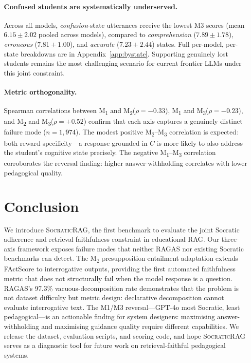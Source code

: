 \documentclass[11pt]{article}
\newcommand{\ours}{\textsc{SocraticRAG}\xspace}
\newcommand{\mtwo}{M\textsubscript{2}\xspace}
\newcommand{\mone}{M\textsubscript{1}\xspace}
\newcommand{\mthree}{M\textsubscript{3}\xspace}
\begin{document}
\paragraph{Confused students are systematically underserved.}
Across all models, \textit{confusion}-state utterances receive the lowest
M3 scores (mean $6.15 \pm 2.02$ pooled across models), compared to
\textit{comprehension} ($7.89 \pm 1.78$), \textit{erroneous} ($7.81 \pm
1.00$), and \textit{accurate} ($7.23 \pm 2.44$) states.
Full per-model, per-state breakdowns are in Appendix~\ref{app:bystate}.
Supporting genuinely lost students remains the most challenging scenario for
current frontier LLMs under this joint constraint.

\paragraph{Metric orthogonality.}
Spearman correlations between \mone and \mtwo ($\rho = {-0.33}$), \mone and
\mthree ($\rho = {-0.23}$), and \mtwo and \mthree ($\rho = {+0.52}$) confirm
that each axis captures a genuinely distinct failure mode ($n = 1{,}974$).
The modest positive \mtwo--\mthree correlation is expected: both reward
specificity---a response grounded in $C$ is more likely to also address the
student's cognitive state precisely.
The negative \mone--\mthree correlation corroborates the reversal finding:
higher answer-withholding correlates with lower pedagogical quality.

\section{Conclusion}

We introduce \ours, the first benchmark to evaluate the joint Socratic
adherence and retrieval faithfulness constraint in educational RAG.
Our three-axis framework exposes failure modes that neither RAGAS nor
existing Socratic benchmarks can detect.
The \mtwo presupposition-entailment adaptation extends FActScore to
interrogative outputs, providing the first automated faithfulness metric
that does not structurally fail when the model response is a question.
RAGAS's 97.3\% vacuous-decomposition rate demonstrates that the problem is
not dataset difficulty but metric design: declarative decomposition cannot
evaluate interrogative text.
The M1/M3 reversal---GPT-4o most Socratic, least pedagogical---is an
actionable finding for system designers: maximising answer-withholding and
maximising guidance quality require different capabilities.
We release the dataset, evaluation scripts, and scoring code, and hope
\ours serves as a diagnostic tool for future work on retrieval-faithful
pedagogical systems.
\end{document}
